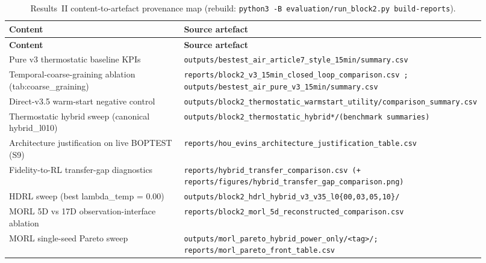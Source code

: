 \documentclass[11pt,a4paper]{article}
\begin{document}
\footnotesize
\begin{longtable}{@{}p{0.40\linewidth} p{0.52\linewidth}@{}}
\caption{Results~II content-to-artefact provenance map (rebuild: \texttt{python3 -B evaluation/run\_block2.py build-reports}).}\label{tab:prov-r2}\\
\textbf{Content} & \textbf{Source artefact}\\ \midrule \endfirsthead
\textbf{Content} & \textbf{Source artefact}\\ \midrule \endhead
Pure v3 thermostatic baseline KPIs & \texttt{outputs/\allowbreak bestest\_\allowbreak air\_\allowbreak article7\_\allowbreak style\_\allowbreak 15min/\allowbreak summary.csv} \\
Temporal-coarse-graining ablation (tab:coarse\_graining) & \texttt{reports/\allowbreak block2\_\allowbreak v3\_\allowbreak 15min\_\allowbreak closed\_\allowbreak loop\_\allowbreak comparison.csv ; outputs/\allowbreak bestest\_\allowbreak air\_\allowbreak pure\_\allowbreak v3\_\allowbreak 15min/\allowbreak summary.csv} \\
Direct-v3.5 warm-start negative control & \texttt{outputs/\allowbreak block2\_\allowbreak thermostatic\_\allowbreak warmstart\_\allowbreak utility/\allowbreak comparison\_\allowbreak summary.csv} \\
Thermostatic hybrid sweep (canonical hybrid\_l010) & \texttt{outputs/\allowbreak block2\_\allowbreak thermostatic\_\allowbreak *hybrid*/\allowbreak   (benchmark summaries)} \\
Architecture justification on live BOPTEST (S9) & \texttt{reports/\allowbreak hou\_\allowbreak evins\_\allowbreak architecture\_\allowbreak justification\_\allowbreak table.csv} \\
Fidelity-to-RL transfer-gap diagnostics & \texttt{reports/\allowbreak hybrid\_\allowbreak transfer\_\allowbreak comparison.csv (+ reports/\allowbreak figures/\allowbreak hybrid\_\allowbreak transfer\_\allowbreak gap\_\allowbreak comparison.png)} \\
HDRL sweep (best lambda\_temp = 0.00) & \texttt{outputs/\allowbreak block2\_\allowbreak hdrl\_\allowbreak hybrid\_\allowbreak v3\_\allowbreak v35\_\allowbreak l0\{00,03,05,10\}/\allowbreak } \\
MORL 5D vs 17D observation-interface ablation & \texttt{reports/\allowbreak block2\_\allowbreak morl\_\allowbreak 5d\_\allowbreak reconstructed\_\allowbreak comparison.csv} \\
MORL single-seed Pareto sweep & \texttt{outputs/\allowbreak morl\_\allowbreak pareto\_\allowbreak hybrid\_\allowbreak power\_\allowbreak only/\allowbreak <tag>/\allowbreak  ; reports/\allowbreak morl\_\allowbreak pareto\_\allowbreak front\_\allowbreak table.csv} \\

\end{longtable}
\end{document}
